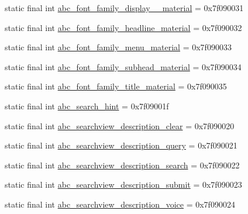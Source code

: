 \begin{CompactItemize}
\item 
static final int \hyperlink{classandroid_1_1support_1_1graphics_1_1drawable_1_1animated_1_1_r_1_1string_39299ef2b092812351b0996540c0b349}{abc\_\-font\_\-family\_\-display\_\_\-material} = 0x7f090031
\item 
static final int \hyperlink{classandroid_1_1support_1_1graphics_1_1drawable_1_1animated_1_1_r_1_1string_a702e334890be3543d4be57191611de3}{abc\_\-font\_\-family\_\-headline\_\-material} = 0x7f090032
\item 
static final int \hyperlink{classandroid_1_1support_1_1graphics_1_1drawable_1_1animated_1_1_r_1_1string_0fb63937693994d49b0580835653730f}{abc\_\-font\_\-family\_\-menu\_\-material} = 0x7f090033
\item 
static final int \hyperlink{classandroid_1_1support_1_1graphics_1_1drawable_1_1animated_1_1_r_1_1string_c8a6dd859d0dd1ef9b933877a0fb8b39}{abc\_\-font\_\-family\_\-subhead\_\-material} = 0x7f090034
\item 
static final int \hyperlink{classandroid_1_1support_1_1graphics_1_1drawable_1_1animated_1_1_r_1_1string_0056581ce4624fe63e8111a32d7d451d}{abc\_\-font\_\-family\_\-title\_\-material} = 0x7f090035
\item 
static final int \hyperlink{classandroid_1_1support_1_1graphics_1_1drawable_1_1animated_1_1_r_1_1string_37c4d957fe1c310c5f5f63bfdf6164f5}{abc\_\-search\_\-hint} = 0x7f09001f
\item 
static final int \hyperlink{classandroid_1_1support_1_1graphics_1_1drawable_1_1animated_1_1_r_1_1string_2e483db999ed3efb501d183d61d40c3c}{abc\_\-searchview\_\-description\_\-clear} = 0x7f090020
\item 
static final int \hyperlink{classandroid_1_1support_1_1graphics_1_1drawable_1_1animated_1_1_r_1_1string_998a9b963ee9698eb28b26bec8c36748}{abc\_\-searchview\_\-description\_\-query} = 0x7f090021
\item 
static final int \hyperlink{classandroid_1_1support_1_1graphics_1_1drawable_1_1animated_1_1_r_1_1string_9bd1d7a5cf4ba43ad929f2a174ff20fe}{abc\_\-searchview\_\-description\_\-search} = 0x7f090022
\item 
static final int \hyperlink{classandroid_1_1support_1_1graphics_1_1drawable_1_1animated_1_1_r_1_1string_e70404da3422df0399fa751f154a10f3}{abc\_\-searchview\_\-description\_\-submit} = 0x7f090023
\item 
static final int \hyperlink{classandroid_1_1support_1_1graphics_1_1drawable_1_1animated_1_1_r_1_1string_942fbf5c7f7066dd3ce227e7caecec57}{abc\_\-searchview\_\-description\_\-voice} = 0x7f090024

\end{CompactItemize}
